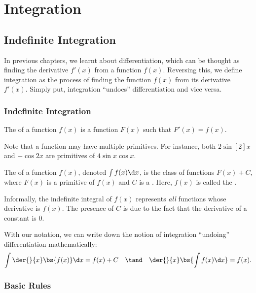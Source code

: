 \chapter{Integration}\label{sec:integration}

\section{Indefinite Integration}

In previous chapters, we learnt about differentiation, which can be thought as finding the derivative $f'(x)$ from a function $f(x)$. Reversing this, we define integration as the process of finding the function $f(x)$ from its derivative $f'(x)$. Simply put, integration ``undoes'' differentiation and vice versa.

\subsection{Indefinite Integration}

\begin{definition}
    The  of a function $f(x)$ is a function $F(x)$ such that $F'(x) = f(x)$.
\end{definition}

Note that a function may have multiple primitives. For instance, both $2\sin[2]{x}$ and $-\cos{2x}$ are primitives of $4\sin{x}\cos{x}$.

\begin{definition}
    The  of a function $f(x)$, denoted $\int f(x) \d x$, is the class of functions $F(x) + C$, where $F(x)$ is a primitive of $f(x)$ and $C$ is a . Here, $f(x)$ is called the .
\end{definition}

Informally, the indefinite integral of $f(x)$ represents \emph{all} functions whose derivative is $f(x)$. The presence of $C$ is due to the fact that the derivative of a constant is 0.

With our notation, we can write down the notion of integration ``undoing'' differentiation mathematically: \[\int \der{}{x} \bs{f(x)} \d x = f(x) + C \quad \tand \quad \der{}{x} \bs{\int f(x) \d x} = f(x).\]

\subsection{Basic Rules}

